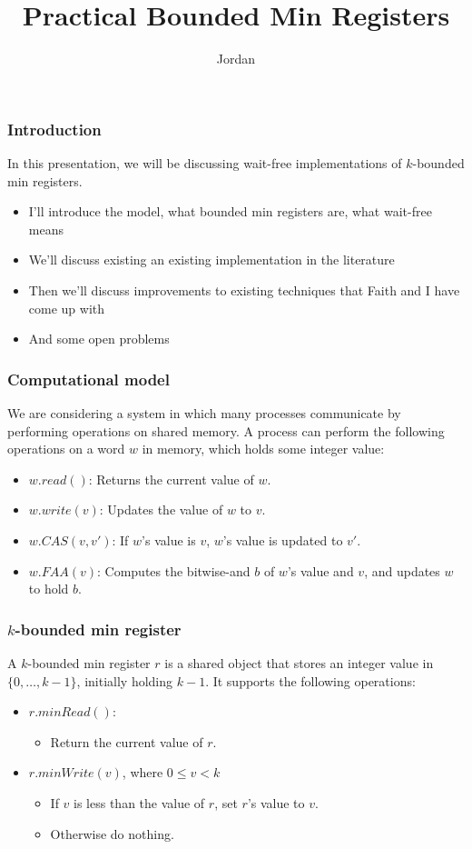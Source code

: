 \documentclass{beamer}
\title{Practical Bounded Min Registers}
\author{Jordan}
\begin{document}
\frame{\titlepage}
\begin{frame}
\frametitle{Introduction}
In this presentation, we will be discussing wait-free implementations of $k$-bounded min registers.
\begin{itemize}
	\item I'll introduce the model, what bounded min registers are, what wait-free means
	\item We'll discuss existing an existing implementation in the literature
	\item Then we'll discuss improvements to existing techniques that Faith and I have come up with
	\item And some open problems
\end{itemize}
\end{frame}
\begin{frame}
\frametitle{Computational model}
We are considering a system in which many processes communicate by performing operations on shared memory.
A process can perform the following operations on a word $w$ in memory, which holds some integer value:
\begin{itemize}
	\item $w.read()$: Returns the current value of $w$.
	\item $w.write(v)$: Updates the value of $w$ to $v$.
	\item $w.CAS(v,v')$: If $w$'s value is $v$, $w$'s value is updated to $v'$.
	\item $w.FAA(v)$: Computes the bitwise-and $b$ of $w$'s value and $v$, and updates $w$ to hold $b$.
\end{itemize}
\end{frame}
\begin{frame}
\frametitle{$k$-bounded min register}
	A $k$-bounded min register $r$ is a shared object that stores an integer value in $\{0, \dots, k-1\}$, initially holding $k-1$.
	It supports the following operations:
	\begin{itemize}
		\item $r.minRead()$: 
		\begin{itemize}
			\item Return the current value of $r$.
		\end{itemize}
		\item $r.minWrite(v)$, where $0 \le v < k$ 
		\begin{itemize}
			\item If $v$ is less than the value of $r$, set $r$'s value to $v$. 
			\item Otherwise do nothing.
		\end{itemize}
	\end{itemize}
\end{frame}
\end{document}
